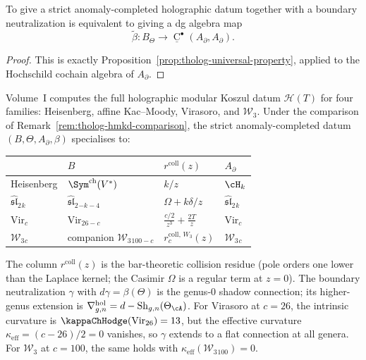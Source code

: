 \begin{proposition}
\label{prop:tholog-universal-boundary-lift}
To give a strict anomaly-completed holographic datum together with a boundary neutralization is equivalent to giving a dg algebra map
\[
\widetilde\beta:B_{\Theta}\longrightarrow \underline{\operatorname{C}}^{\bullet}(A_{\partial},A_{\partial}).
\]
\end{proposition}

\begin{proof}
This is exactly Proposition~\ref{prop:tholog-universal-property}, applied to the Hochschild cochain algebra of \(A_{\partial}\).
\end{proof}

\begin{remark}
\label{rem:tholog-computed-examples}
Volume~I computes the full holographic modular Koszul datum
$\mathcal{H}(T)$ for four families: Heisenberg, affine
Kac--Moody, Virasoro, and $\mathcal W_3$.
Under the comparison of
Remark~\ref{rem:tholog-hmkd-comparison}, the strict
anomaly-completed datum $(B,\Theta,A_\partial,\beta)$
specialises to:
\begin{center}
\renewcommand{\arraystretch}{1.15}
\begin{tabular}{llll}
& $B$ & $r^{\mathrm{coll}}(z)$ & $A_\partial$ \\
\hline
Heisenberg & $\Sym^{\mathrm{ch}}(V^*)$ & $k/z$ & $\cH_k$ \\
$\widehat{\mathfrak{sl}}_2{}_k$
 & $\widehat{\mathfrak{sl}}_2{}_{-k-4}$
 & $\Omega + k\delta/z$
 & $\widehat{\mathfrak{sl}}_2{}_k$ \\
$\mathrm{Vir}_c$
 & $\mathrm{Vir}_{26-c}$
 & $\frac{c/2}{z^3}+\frac{2T}{z}$
 & $\mathrm{Vir}_c$ \\
$\mathcal W_3{}_c$
 & companion $\mathcal W_3{}_{100-c}$
 & $r_c^{\mathrm{coll},\,W_3}(z)$
 & $\mathcal W_3{}_c$
\end{tabular}
\end{center}
\noindent
The column $r^{\mathrm{coll}}(z)$ is the bar-theoretic
collision residue (pole orders one lower than the Laplace kernel;
the Casimir $\Omega$ is a regular term at $z=0$).
The boundary neutralization $\gamma$ with
$d\gamma=\beta(\Theta)$ is the genus-$0$ shadow connection;
its higher-genus extension is
$\nabla^{\mathrm{hol}}_{g,n}=d-\mathrm{Sh}_{g,n}(\Theta_\cA)$.
For Virasoro at $c=26$, the intrinsic curvature is
$\kappaChHodge(\mathrm{Vir}_{26})=13$, but the effective curvature
$\kappa_{\mathrm{eff}}=(c-26)/2=0$ vanishes, so $\gamma$
extends to a flat connection at all genera.
For $\mathcal W_3$ at $c=100$, the same holds with
$\kappa_{\mathrm{eff}}(\mathcal W_3{}_{100})=0$.
\end{remark}


